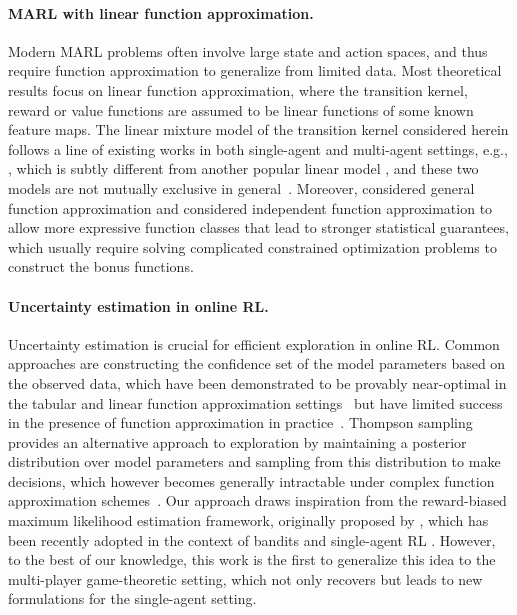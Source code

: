\paragraph{MARL with linear function approximation.} Modern MARL problems often involve large state and action spaces, and thus require function approximation to generalize from limited data. Most theoretical results focus on linear function approximation, where the transition kernel, reward or value functions are assumed to be linear functions of some known feature maps. The linear mixture model of the transition kernel considered herein follows a line of existing works in both single-agent and multi-agent settings, e.g., \citet{ayoub2020model,chen2022almost,modi2020sample,jia2020model,chen2022almost,liu2024maximize}, which is subtly different from another popular linear model \citep{jin2020provably,wang2019optimism,yang2019sample,xie2020learning}, and these two models are not mutually exclusive in general~\citep{chen2022almost}. Moreover, \citet{ni2022representation,huang2022towards} considered general function approximation and \citet{cui2023breaking,wang2023breaking,dai2024refined} considered independent function approximation to allow more expressive function classes that lead to stronger statistical guarantees, which usually require solving complicated constrained optimization problems to construct the bonus functions. 

\paragraph{Uncertainty estimation in online RL.} Uncertainty estimation is crucial for efficient exploration in online RL. Common approaches are constructing the confidence set of the model parameters based on the observed data, which have been demonstrated to be provably near-optimal in the tabular and linear function approximation settings~\citep{jin2018q,agarwal2023vo} but have  limited success in the presence of function approximation in practice~\citep{gawlikowski2023survey}. Thompson sampling provides an alternative approach to exploration by maintaining a posterior distribution over model parameters and sampling from this distribution to make decisions, which however becomes generally intractable under complex function approximation schemes~\citep{russo2018tutorial}. Our approach draws inspiration from the reward-biased maximum likelihood estimation framework, originally proposed by \citet{kumar1982new}, which has been recently adopted in the context of bandits \citep{liu2020exploration,hung2021reward,cen2024value} and single-agent RL \citep{mete2021reward,liu2024maximize}. However, to the best of our knowledge, this work is the first to generalize this idea to the multi-player game-theoretic setting, which not only recovers but leads to new formulations for the single-agent setting.

